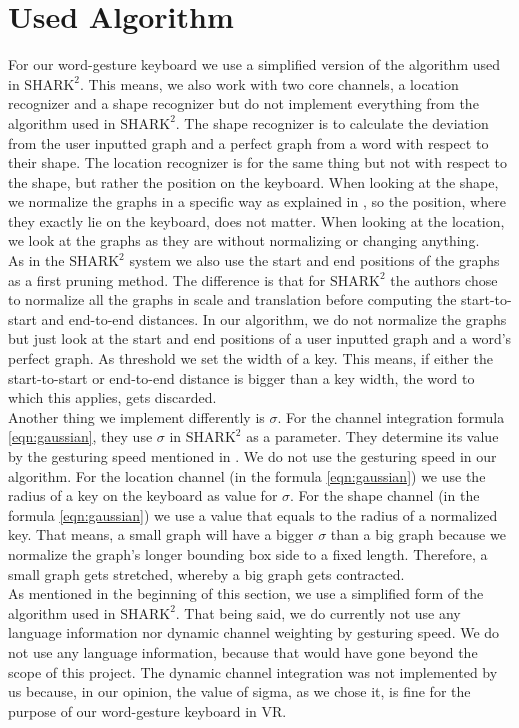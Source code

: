 \section{Used Algorithm}
For our word-gesture keyboard we use a simplified version of the algorithm used in $\text{SHARK}^2$. This means, we also work with two core channels, a location recognizer and a shape recognizer but do not implement everything from the algorithm used in $\text{SHARK}^2$. The shape recognizer is to calculate the deviation from the user inputted graph and a perfect graph from a word with respect to their shape. The location recognizer is for the same thing but not with respect to the shape, but rather the position on the keyboard. When looking at the shape, we normalize the graphs in a specific way as explained in , so the position, where they exactly lie on the keyboard, does not matter. When looking at the location, we look at the graphs as they are without normalizing or changing anything.\\
As in the $\text{SHARK}^2$ system we also use the start and end positions of the graphs as a first pruning method. The difference is that for $\text{SHARK}^2$ the authors chose to normalize all the graphs in scale and translation before computing the start-to-start and end-to-end distances. In our algorithm, we do not normalize the graphs but just look at the start and end positions of a user inputted graph and a word's perfect graph. As threshold we set the width of a key. This means, if either the start-to-start or end-to-end distance is bigger than a key width, the word to which this applies, gets discarded.\\
Another thing we implement differently is $\sigma$. For the channel integration formula \ref{eqn:gaussian}, they use $\sigma$ in $\text{SHARK}^2$ as a parameter. They determine its value by the gesturing speed mentioned in . We do not use the gesturing speed in our algorithm. For the location channel (in the formula \ref{eqn:gaussian}) we use the radius of a key on the keyboard as value for $\sigma$. For the shape channel (in the formula \ref{eqn:gaussian}) we use a value that equals to the radius of a normalized key. That means, a small graph will have a bigger $\sigma$ than a big graph because we normalize the graph's longer bounding box side to a fixed length. Therefore, a small graph gets stretched, whereby a big graph gets contracted.\\
As mentioned in the beginning of this section, we use a simplified form of the algorithm used in $\text{SHARK}^2$. That being said, we do currently not use any language information nor dynamic channel weighting by gesturing speed. We do not use any language information, because that would have gone beyond the scope of this project. The dynamic channel integration was not implemented by us because, in our opinion, the value of sigma, as we chose it, is fine for the purpose of our word-gesture keyboard in VR.

